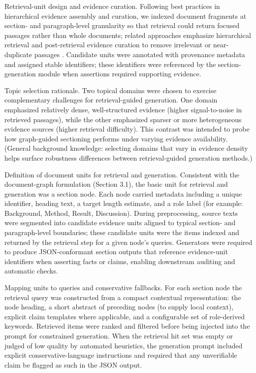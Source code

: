 Retrieval-unit design and evidence curation. Following best practices in hierarchical evidence assembly and curation, we indexed document fragments at section- and paragraph-level granularity so that retrieval could return focused passages rather than whole documents; related approaches emphasize hierarchical retrieval and post-retrieval evidence curation to remove irrelevant or near-duplicate passages \cite{web_choe_2025_hierarchical_retrieval_with_evidence_curation_fo}. Candidate units were annotated with provenance metadata and assigned stable identifiers; these identifiers were referenced by the section-generation module when assertions required supporting evidence.

Topic selection rationale. Two topical domains were chosen to exercise complementary challenges for retrieval-guided generation. One domain emphasized relatively dense, well-structured evidence (higher signal-to-noise in retrieved passages), while the other emphasized sparser or more heterogeneous evidence sources (higher retrieval difficulty). This contrast was intended to probe how graph-guided sectioning performs under varying evidence availability. (General background knowledge: selecting domains that vary in evidence density helps surface robustness differences between retrieval-guided generation methods.)

Definition of document units for retrieval and generation. Consistent with the document-graph formulation (Section 3.1), the basic unit for retrieval and generation was a section node. Each node carried metadata including a unique identifier, heading text, a target length estimate, and a role label (for example: Background, Method, Result, Discussion). During preprocessing, source texts were segmented into candidate evidence units aligned to typical section- and paragraph-level boundaries; these candidate units were the items indexed and returned by the retrieval step for a given node's queries. Generators were required to produce JSON-conformant section outputs that reference evidence-unit identifiers when asserting facts or claims, enabling downstream auditing and automatic checks.

Mapping units to queries and conservative fallbacks. For each section node the retrieval query was constructed from a compact contextual representation: the node heading, a short abstract of preceding nodes (to supply local context), explicit claim templates where applicable, and a configurable set of role-derived keywords. Retrieved items were ranked and filtered before being injected into the prompt for constrained generation. When the retrieval hit set was empty or judged of low quality by automated heuristics, the generation prompt included explicit conservative-language instructions and required that any unverifiable claim be flagged as such in the JSON output.

